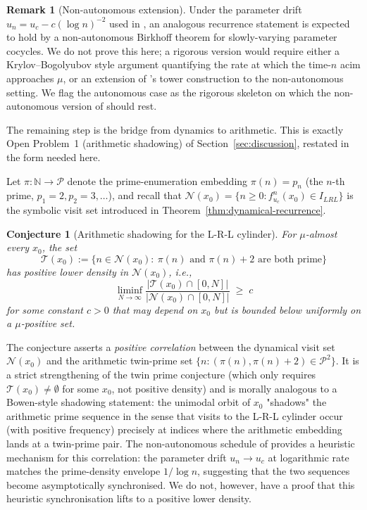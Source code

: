 \documentclass{iopjournal}
\newtheorem{conjecture}{Conjecture}
\theoremstyle{definition}
\newtheorem{remark}{Remark}
\begin{document}
\begin{remark}[Non-autonomous extension]
\label{rem:non-auto}
Under the parameter drift $u_n = u_c - c (\log n)^{-2}$ used in
\cite{wang2026emergence}, an analogous recurrence statement is expected
to hold by a non-autonomous Birkhoff theorem for slowly-varying
parameter cocycles. We do not prove this here; a rigorous version
would require either a Krylov--Bogolyubov style argument quantifying
the rate at which the time-$n$ acim approaches $\mu$, or an extension
of \cite{young1992decay}'s tower construction to the non-autonomous
setting. We flag the autonomous case as the rigorous skeleton on which
the non-autonomous version of \cite{wang2026emergence} should rest.
\end{remark}

The remaining step is the bridge from dynamics to arithmetic. This is
exactly Open Problem~1 (arithmetic shadowing) of
Section~\ref{sec:discussion}, restated in the form needed here.

Let $\pi : \mathbb{N} \to \mathcal{P}$ denote the prime-enumeration
embedding $\pi(n) = p_n$ (the $n$-th prime, $p_1 = 2, p_2 = 3, \ldots$),
and recall that $\mathcal{N}(x_0) = \{ n \geq 0 : f_{u_c}^n(x_0) \in I_{LRL}\}$
is the symbolic visit set introduced in
Theorem~\ref{thm:dynamical-recurrence}.

\begin{conjecture}[Arithmetic shadowing for the L-R-L cylinder]
\label{conj:arith-shadow-LRL}
For $\mu$-almost every $x_0$, the set
\[
    \mathcal{T}(x_0) := \{ n \in \mathcal{N}(x_0) :\
        \pi(n) \text{ and } \pi(n) + 2 \text{ are both prime} \}
\]
has positive lower density in $\mathcal{N}(x_0)$, i.e.,
\[
    \liminf_{N \to \infty}
    \frac{|\mathcal{T}(x_0) \cap [0, N]|}{|\mathcal{N}(x_0) \cap [0, N]|}
    \;\geq\; c
\]
for some constant $c > 0$ that may depend on $x_0$ but is bounded
below uniformly on a $\mu$-positive set.
\end{conjecture}

The conjecture asserts a \emph{positive correlation} between the
dynamical visit set $\mathcal{N}(x_0)$ and the arithmetic twin-prime
set $\{n : (\pi(n), \pi(n)+2) \in \mathcal{P}^2\}$. It is a strict
strengthening of the twin prime conjecture (which only requires
$\mathcal{T}(x_0) \neq \emptyset$ for some $x_0$, not positive density)
and is morally analogous to a Bowen-style shadowing statement: the
unimodal orbit of $x_0$ "shadows" the arithmetic prime sequence in the
sense that visits to the L-R-L cylinder occur (with positive
frequency) precisely at indices where the arithmetic embedding lands
at a twin-prime pair. The non-autonomous schedule of
\cite{wang2026emergence} provides a heuristic mechanism for this
correlation: the parameter drift $u_n \to u_c$ at logarithmic rate
matches the prime-density envelope $1/\log n$, suggesting that the
two sequences become asymptotically synchronised. We do not, however,
have a proof that this heuristic synchronisation lifts to a positive
lower density.
\end{document}
